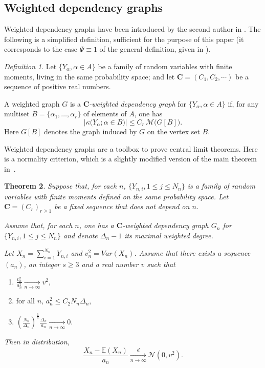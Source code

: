 \documentclass{amsart}
\def\a{\alpha}
\def\WDep{G}
\def\bC{\bm{C}}
\def\ka{\kappa}
\def\bC{\bm{C}}
\newcommand{\MWST}[1]{\mathcal{M} \big( #1 \big)}
\numberwithin{equation}{section}
\newtheorem{theorem}{Theorem}[section]
\theoremstyle{remark}
\newtheorem{definition}[theorem]{Definition}
\begin{document}
\subsection{Weighted dependency graphs}
Weighted dependency graphs have been introduced by the second author in \cite{Valentin}.
The following is a simplified definition, sufficient for the purpose of this paper
(it corresponds to the case $\Psi \equiv 1$ of the general definition, given in \cite{Valentin}).
\begin{definition}
\label{Def:WDG}
Let $\{Y_\a,\a \in A\}$ be a family of random variables with finite moments,
living in the same probability space;
and let $\bC=(C_1,C_2,\cdots)$ be a sequence of positive real numbers.

A weighted graph $\WDep$ is a {\em $\bC$-weighted dependency graph}
for $\{Y_\a,\a \in A\}$ if, 
for any multiset \hbox{$B=\{\a_1,\ldots,\a_r\}$} of elements of $A$,
one has
\begin{equation}
    \bigg| \ka\big( Y_\a ; \a \in B \big) \bigg| \le
    C_r \, \MWST{\WDep[B]}. 
    \label{EqFundamental}
\end{equation}
Here $\WDep[B]$ denotes the graph induced by $\WDep$ on the vertex set $B$.
\end{definition}

Weighted dependency graphs are a toolbox to prove central limit theorems.
Here is a normality criterion, which is a slightly
modified version of the main theorem in~\cite{Valentin}.

\begin{theorem}
\label{th:4.11modif}
Suppose that, for each $n$, $\{ Y_{n,i}, 1 \leq j \leq N_n\}$ is a family of random variables with finite moments defined on the same probability space. 
Let $\mathbf{C} = (C_r)_{r \geq 1}$ be a fixed sequence that does not depend on $n$.

Assume that, for each $n$, one has a $\mathbf{C}$-weighted dependency graph $\WDep_n$ for $\{ Y_{n,i}, 1 \leq j \leq N_n\}$ 
and denote $\Delta_n-1$ its maximal weighted degree.

Let $X_n = \sum_{i=1}^{N_n} Y_{n,i}$ and $v^2_n = Var (X_n)$.
Assume that there exists a sequence $(a_n)$, an integer $s \ge 3$ and a real number $v$ such that

\begin{enumerate}
\item $\displaystyle \frac{v_n^2}{a_n^2} \xrightarrow[n \to\infty]{} v^2,$
\item $\displaystyle \text{for all $n$, } a_n^2 \leq C_2 N_n \Delta_n,$
\item $\displaystyle \left( \frac{N_n}{\Delta_n} \right) ^{\frac{1}{s}} \frac{\Delta_n}{a_n} \xrightarrow[n\to\infty]{} 0.$
\end{enumerate}


Then in distribution,
$$\frac{X_n - \mathbb{E}(X_n)}{a_n} \xrightarrow[n\to\infty]{d} \mathcal{N}(0, v^2).$$
\end{theorem}
\end{document}
